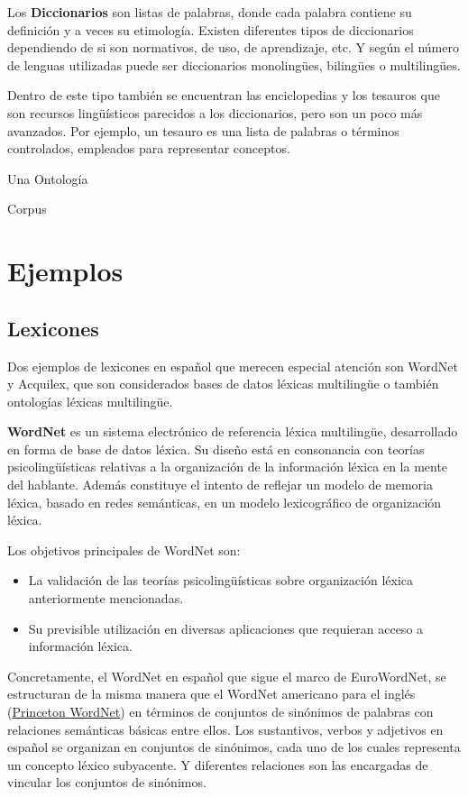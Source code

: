 \documentclass[11pt]{exam}
\begin{document}
\begin{questions}
Los {\bf Diccionarios} son listas de palabras, donde cada palabra contiene su definición y a veces su etimología. Existen diferentes tipos de diccionarios dependiendo de si son normativos, de uso, de aprendizaje, etc. Y según el número de lenguas utilizadas puede ser diccionarios monolingües, bilingües o multilingües.

Dentro de este tipo también se encuentran las enciclopedias y los tesauros que son recursos lingüísticos parecidos a los diccionarios, pero son un poco más avanzados. Por ejemplo, un tesauro es una lista de palabras o términos controlados, empleados para representar conceptos.

Una Ontología

Corpus

\section*{Ejemplos}

\subsection*{Lexicones}

Dos ejemplos de lexicones en español que merecen especial atención son WordNet y Acquilex, que son considerados bases de datos léxicas multilingüe o también ontologías léxicas multilingüe. 

{\bf WordNet} es un sistema electrónico de referencia léxica multilingüe, desarrollado en forma de base de datos léxica. Su diseño está en consonancia con teorías psicolingüísticas relativas a la organización de la información léxica en la mente del hablante. Además constituye el intento de reflejar un modelo de memoria léxica, basado en redes semánticas, en un modelo lexicográfico de organización léxica. 

Los objetivos principales de WordNet son: 

\begin{itemize}
	\item La validación de las teorías psicolingüísticas sobre organización léxica anteriormente mencionadas.
	\item Su previsible utilización en diversas aplicaciones que requieran acceso a información léxica.
\end{itemize}

Concretamente, el WordNet en español que sigue el marco de EuroWordNet, se estructuran de la misma manera que el WordNet americano para el inglés (\href{https://wordnet.princeton.edu/}{Princeton WordNet}) en términos de conjuntos de sinónimos de palabras con relaciones semánticas básicas entre ellos. Los sustantivos, verbos y adjetivos en español se organizan en conjuntos de sinónimos, cada uno de los cuales representa un concepto léxico subyacente. Y diferentes relaciones son las encargadas de vincular los conjuntos de sinónimos. 


\end{questions}
\end{document}

